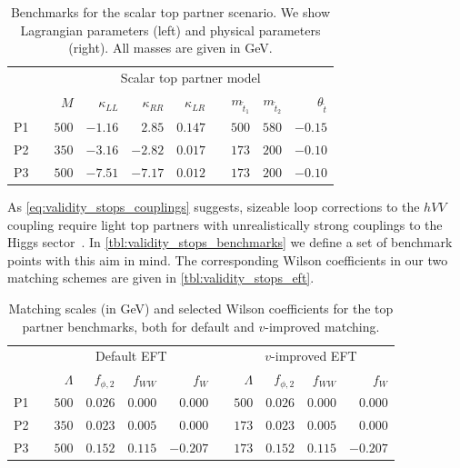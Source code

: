 \begin{table}
\begin{tabular}{c c rrrr c rrr}
  \toprule
  \multirow{2}{*}{}
  && \multicolumn{8}{c}{Scalar top partner model} \\
  \cmidrule{3-10}
  && $M$ & $\kappa_{LL}$ & $\kappa_{RR}$ & $\kappa_{LR}$
  && $m_{\tilde{t}_{1}}$ & $m_{{\tilde{t}_{2}}}$ & $\theta_{\tilde{t}}$ \\
  \midrule
  P1 && $500$ & $-1.16$ & $2.85$ & $0.147$ && $500$ & $580$ & $-0.15$ \\
  P2 && $350$ & $-3.16$ & $-2.82$ & $0.017$ && $173$ & $200$ & $-0.10$ \\
  P3 && $500$ & $-7.51$ & $-7.17$ & $0.012$ && $173$ & $200$ & $-0.10$ \\
  \bottomrule
 \end{tabular}
 \caption[Benchmarks for the top partners]{Benchmarks for the
   scalar top partner scenario. We show Lagrangian parameters (left)
   and physical parameters (right). All masses are given in GeV.}
  \label{tbl:validity_stops_benchmarks}
\end{table}

As \autoref{eq:validity_stops_couplings} suggests, sizeable loop
corrections to the $hVV$ coupling require light top partners with
unrealistically strong couplings to the Higgs
sector~\cite{Hollik:2008xn}. In
\autoref{tbl:validity_stops_benchmarks} we define a set of benchmark
points with this aim in mind. The corresponding Wilson coefficients in
our two matching schemes are given in
\autoref{tbl:validity_stops_eft}.

\begin{table}
  \begin{tabular}{c c rrrr c rrrr}
    \toprule
    \multirow{2}{*}{}
    && \multicolumn{4}{c}{Default EFT} && \multicolumn{4}{c}{$v$-improved EFT} \\
    \cmidrule{3-6} \cmidrule{8-11}
    && $\Lambda$ & $f_{\phi,2}$ & $f_{WW}$ & $f_W$
    && $\Lambda$ & $f_{\phi,2}$ & $f_{WW}$ & $f_W$ \\
    \midrule
    P1 && $500$ & $0.026$ & $0.000$ & $0.000$ && $500$ & $0.026$ & $0.000$ & $0.000$\\
    P2 && $350$ & $0.023$ & $0.005$ & $0.000$ && $173$ & $0.023$ & $0.005$ & $0.000$ \\
    P3 && $500$ & $0.152$ & $0.115$ & $-0.207$ && $173$ & $0.152$ & $0.115$ & $-0.207$ \\
    \bottomrule
  \end{tabular}
  \caption[EFT description for the top partner benchmarks]{Matching
    scales (in GeV) and selected Wilson coefficients
    for the top partner benchmarks, both for default and $v$-improved
    matching.}
  \label{tbl:validity_stops_eft}
\end{table}


